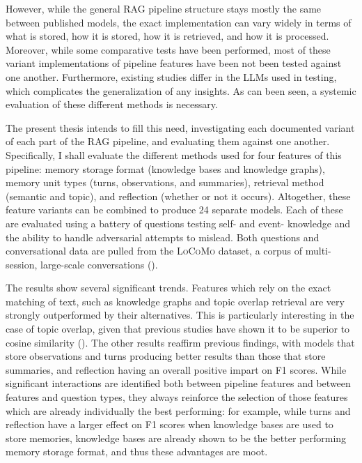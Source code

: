 	However, while the general RAG pipeline structure stays mostly the same between published models, the exact implementation can vary widely in terms of what is stored, how it is stored, how it is retrieved, and how it is processed. Moreover, while some comparative tests have been performed, most of these variant implementations of pipeline features have been not been tested against one another. Furthermore, existing studies differ in the LLMs used in testing, which complicates the generalization of any insights. As can been seen, a systemic evaluation of these different methods is necessary.
	
	The present thesis intends to fill this need, investigating each documented variant of each part of the RAG pipeline, and evaluating them against one another. Specifically, I shall evaluate the different methods used for four features of this pipeline: memory storage format (knowledge bases and knowledge graphs), memory unit types (turns, observations, and summaries), retrieval method (semantic and topic), and reflection (whether or not it occurs). Altogether, these feature variants can be combined to produce 24 separate models. Each of these are evaluated using a battery of questions testing self- and event- knowledge and the ability to handle adversarial attempts to mislead. Both questions and conversational data are pulled from the \textsc{LoCoMo} dataset, a corpus of multi-session, large-scale conversations (\cite{Maharana2024}).
	
The results show several significant trends. Features which rely on the exact matching of text, such as knowledge graphs and topic overlap retrieval are very strongly outperformed by their alternatives. This is particularly interesting in the case of topic overlap, given that previous studies have shown it to be superior to cosine similarity (\cite{Li2024}). The other results reaffirm previous findings, with models that store observations and turns producing better results than those that store summaries, and reflection having an overall positive impart on F1 scores. While significant interactions are identified both between pipeline features and between features and question types, they always reinforce the selection of those features which are already individually the best performing: for example, while turns and reflection have a larger effect on F1 scores when knowledge bases are used to store memories, knowledge bases are already shown to be the better performing memory storage format, and thus these advantages are moot.
	
